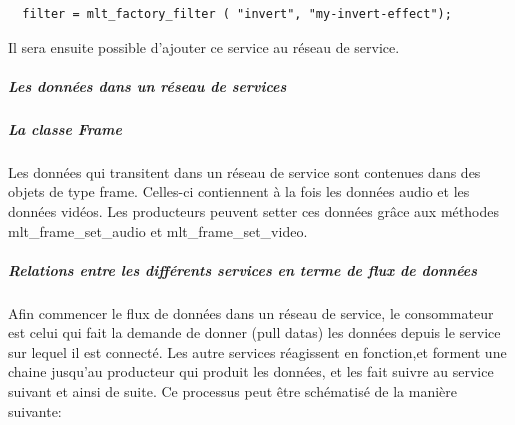 \begin{lstlisting}
  filter = mlt_factory_filter ( "invert", "my-invert-effect");
\end{lstlisting}

Il sera ensuite possible d'ajouter ce service au réseau de service.

\subparagraph{Les données dans un réseau de services}

\subparagraph{La classe Frame}

\subparagraph{}

Les données qui transitent dans un réseau de service sont contenues dans
des objets de type frame. Celles-ci contiennent à la fois les données
audio et les données vidéos. Les producteurs peuvent setter ces données
grâce aux méthodes mlt\_frame\_set\_audio et mlt\_frame\_set\_video.

\subparagraph{Relations entre les différents services en terme de flux
de données}

Afin commencer le flux de données dans un réseau de service, le
consommateur est celui qui fait la demande de donner (pull datas) les
données depuis le service sur lequel il est connecté. Les autre services
réagissent en fonction,et forment une chaine jusqu'au producteur qui
produit les données, et les fait suivre au service suivant et ainsi de
suite. Ce processus peut être schématisé de la manière suivante:

